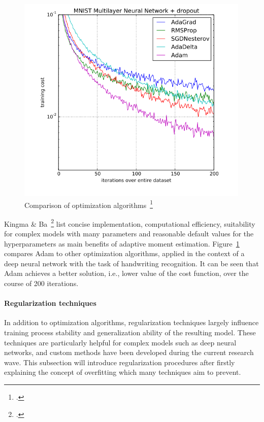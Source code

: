 \begin{figure}[h]
  \centering
  \includegraphics[height=10cm]{img/adam_comparison}
  \caption[Comparison of optimization algorithms]{Comparison of optimization algorithms~\footcite{Kingma2014a}}
\label{fig:adam_comp}
\end{figure}

Kingma \& Ba~\footcite{Kingma2014a} list concise implementation, computational efficiency,
suitability for complex models with many parameters and reasonable default values
for the hyperparameters as main benefits of adaptive moment estimation.
Figure~\ref{fig:adam_comp} compares Adam to other optimization algorithms,
applied in the context of a deep neural network with the task of handwriting
recognition.
It can be seen that Adam achieves a better solution, i.e., lower value of the
cost function, over the course of 200 iterations.

\paragraph{Regularization techniques}
\label{sub:dl_regularization}

In addition to optimization algorithms, regularization techniques largely
influence training process stability and generalization ability of the
resulting model.
These techniques are particularly helpful for complex models such as deep
neural networks, and custom methods have been developed during the current
research wave.
This subsection will introduce regularization procedures after firstly explaining
the concept of overfitting which many techniques aim to prevent.

